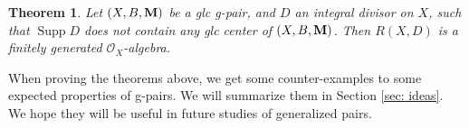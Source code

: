 \documentclass[11pt]{amsart}
\numberwithin{equation}{section}
\newcommand{\Mm}{{\bf{M}}}
\newcommand{\Supp}{\operatorname{Supp}}
\newcommand{\Oo}{\mathcal{O}}
\newtheorem{thm}{Theorem}[section]
\theoremstyle{definition}
\newtheorem{ques}[thm]{Question}
\theoremstyle{definition}
\theoremstyle{definition}
\begin{document}
\begin{thm}\label{thm: finite generation of R(X,A)}
Let $(X,B,\Mm)$ be a glc g-pair, and $D$ an integral divisor on $X$, such that $\Supp D$ does not contain any glc center of $(X,B,\Mm)$. Then $R(X,D)$ is a finitely generated $\Oo_X$-algebra.
\end{thm}


When proving the theorems above, we get some counter-examples to some expected properties of g-pairs. We will summarize them in Section \ref{sec: ideas}. We hope they will be useful in future studies of generalized pairs. 

\begin{comment}
Finally, we recall the following question:

\begin{ques}\label{ques: bpf conjecture gpair}
Let $(X,B,\Mm)/U$ be a glc g-pair and $L$ a nef$/U$ Cartier divisor on $X$ such that $L-(K_X+B+\Mm_X)$ is ample$/U$. Do we have the following?
\begin{enumerate}
    \item $mL$ is base-point-free$/U$ for any integer $m\gg 0$.
    \item $L$ is semi-ample$/U$.
    \item If $L$ is a supporting function of a $(K_X+B+\Mm_X)$-negative extremal ray$/U$, then $mL$ is base-point-free$/U$ for any integer $m\gg 0$.
    \item If $L$ is a supporting function of a $(K_X+B+\Mm_X)$-negative extremal ray$/U$, then $L$ is semi-ample$/U$.
\end{enumerate}
Of course, (1) implies (2) and (3), and (2) or (3) implies (4).
\end{ques}
When $\Mm_X$ is $\mathbb R$-Cartier, Question \ref{ques: bpf conjecture gpair}(3) is true by \cite[Theorem 1.3]{HL21a} and  Question \ref{ques: bpf conjecture gpair}(2) is true by \cite[Theorem 1.2]{LX22}.  Indeed, in this case, Question \ref{ques: bpf conjecture gpair}(1) is also true as it is an easy consequence of \cite[Lemma 5.18]{HL21a} (see Theorem \ref{thm: bpf with mx r cartier}). However, we do not know Question \ref{ques: bpf conjecture gpair} in general when $\Mm_X$ is not $\mathbb R$-Cartier. As the existence of glc flips is completely solved by Theorem \ref{thm: glc flip exists}, a positive answer of Question \ref{ques: bpf conjecture gpair}, even only for Question \ref{ques: bpf conjecture gpair}(4), will allow us to run non-$\mathbb Q$-factorial minimal model programs for glc g-pairs.
\end{comment}
\end{document}
